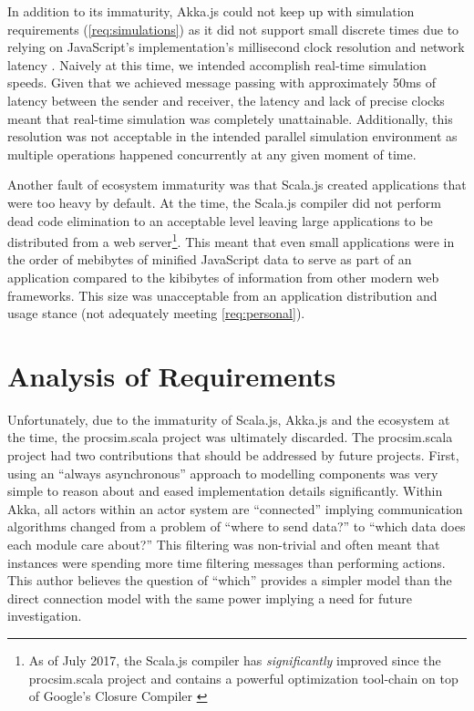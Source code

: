 In addition to its immaturity, Akka.js could not keep up with simulation requirements (\cref{req:simulations}) as it did not support small discrete times due to relying on JavaScript's  implementation's millisecond clock resolution and network latency \cite{MDN:Date}. Naively at this time, we intended accomplish real-time simulation speeds. Given that we achieved message passing with approximately 50ms of latency between the sender and receiver, the latency and lack of precise clocks meant that real-time simulation was completely unattainable. Additionally, this resolution was not acceptable in the intended parallel simulation environment as multiple operations happened concurrently at any given moment of time. 

Another fault of ecosystem immaturity was that Scala.js created applications that were too heavy by default. At the time, the Scala.js compiler did not perform dead code elimination to an acceptable level leaving large applications to be distributed from a web server\footnote{As of July 2017, the Scala.js compiler has \textit{significantly} improved since the procsim.scala project and contains a powerful optimization tool-chain on top of Google's Closure Compiler \cite{Scala-js:CompOptPipeline}}. This meant that even small applications were in the order of mebibytes of minified JavaScript data to serve as part of an application compared to the kibibytes of information from other modern web frameworks. This size was unacceptable from an application distribution and usage stance (not adequately meeting \cref{req:personal}). 

\section{Analysis of Requirements}

Unfortunately, due to the immaturity of Scala.js, Akka.js and the ecosystem at the time, the procsim.scala project was ultimately discarded. The procsim.scala project had two contributions that should be addressed by future projects. First, using an ``always asynchronous'' approach to modelling components was very simple to reason about and eased implementation details significantly. Within Akka, all actors within an actor system are ``connected'' implying communication algorithms changed from a problem of ``where to send data?'' to ``which data does each module care about?'' This filtering was non-trivial and often meant that \akkaActor{} instances were spending more time filtering messages than performing actions. This author believes the question of ``which'' provides a simpler model than the direct connection model with the same power implying a need for future investigation. 

